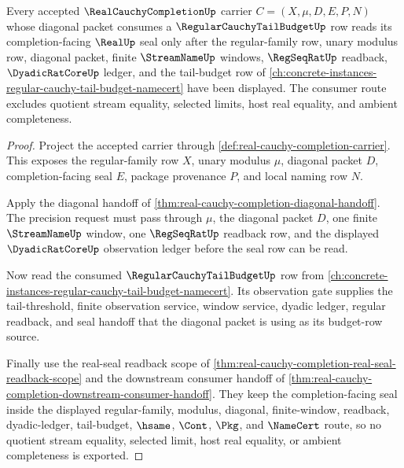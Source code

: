 \begin{theorem}
\label{thm:real-cauchy-completion-tail-budget-coherence-consumer}
Every accepted $\RealCauchyCompletionUp$ carrier $C=(X,\mu,D,E,P,N)$ whose diagonal packet consumes a $\RegularCauchyTailBudgetUp$ row reads its completion-facing $\RealUp$ seal only after the regular-family row, unary modulus row, diagonal packet, finite $\StreamNameUp$ windows, $\RegSeqRatUp$ readback, $\DyadicRatCoreUp$ ledger, and the tail-budget row of \autoref{ch:concrete-instances-regular-cauchy-tail-budget-namecert} have been displayed. The consumer route excludes quotient stream equality, selected limits, host real equality, and ambient completeness.
\end{theorem}
\begin{proof}
Project the accepted carrier through \autoref{def:real-cauchy-completion-carrier}. This exposes the regular-family row $X$, unary modulus $\mu$, diagonal packet $D$, completion-facing seal $E$, package provenance $P$, and local naming row $N$.

Apply the diagonal handoff of \autoref{thm:real-cauchy-completion-diagonal-handoff}. The precision request must pass through $\mu$, the diagonal packet $D$, one finite $\StreamNameUp$ window, one $\RegSeqRatUp$ readback row, and the displayed $\DyadicRatCoreUp$ observation ledger before the seal row can be read.

Now read the consumed $\RegularCauchyTailBudgetUp$ row from \autoref{ch:concrete-instances-regular-cauchy-tail-budget-namecert}. Its observation gate supplies the tail-threshold, finite observation service, window service, dyadic ledger, regular readback, and seal handoff that the diagonal packet is using as its budget-row source.

Finally use the real-seal readback scope of \autoref{thm:real-cauchy-completion-real-seal-readback-scope} and the downstream consumer handoff of \autoref{thm:real-cauchy-completion-downstream-consumer-handoff}. They keep the completion-facing seal inside the displayed regular-family, modulus, diagonal, finite-window, readback, dyadic-ledger, tail-budget, $\hsame$, $\Cont$, $\Pkg$, and $\NameCert$ route, so no quotient stream equality, selected limit, host real equality, or ambient completeness is exported.
\end{proof}

